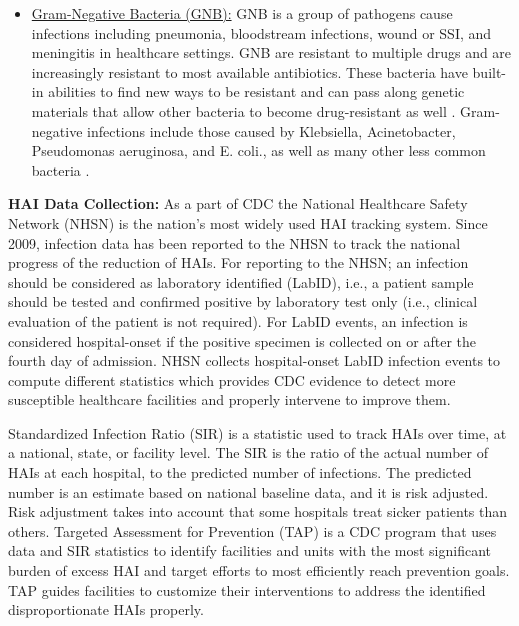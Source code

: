 \begin{itemize}
	\item \underline{Gram-Negative Bacteria (GNB):} GNB is a group of pathogens cause infections including pneumonia, bloodstream infections, wound or SSI, and meningitis in healthcare settings. GNB are resistant to multiple drugs and are increasingly resistant to most available antibiotics. These bacteria have built-in abilities to find new ways to be resistant and can pass along genetic materials that allow other bacteria to become drug-resistant as well \cite{resistance}. Gram-negative infections include those caused by Klebsiella, Acinetobacter, Pseudomonas aeruginosa, and E. coli., as well as many other less common bacteria \cite{gnb}.  
\end{itemize}

{\bf HAI Data Collection:} As a part of CDC the National Healthcare Safety Network (NHSN) is the nation’s most widely used HAI tracking system. Since 2009, infection data has been reported to the NHSN to track the national progress of the reduction of HAIs. For reporting to the NHSN; an infection should be considered as laboratory identified (LabID), i.e., a patient sample should be tested and confirmed positive by laboratory test only (i.e., clinical evaluation of the patient is not required). For LabID events, an infection is considered hospital-onset if the positive specimen is collected on or after the fourth day of admission. NHSN collects hospital-onset LabID infection events to compute different statistics which provides CDC evidence to detect more susceptible healthcare facilities and properly intervene to improve them. 


Standardized Infection Ratio (SIR) is a statistic used to track HAIs over time, at a national, state, or facility level. The SIR is the ratio of the actual number of HAIs at each hospital, to the predicted number of infections. The predicted number is an estimate based on national baseline data, and it is risk adjusted. Risk adjustment takes into account that some hospitals treat sicker patients than others.
Targeted Assessment for Prevention (TAP) is a CDC program that uses data and SIR statistics to identify facilities and units with the most significant burden of excess HAI and target efforts to most efficiently reach prevention goals. TAP guides facilities to customize their interventions to address the identified disproportionate HAIs properly.  



